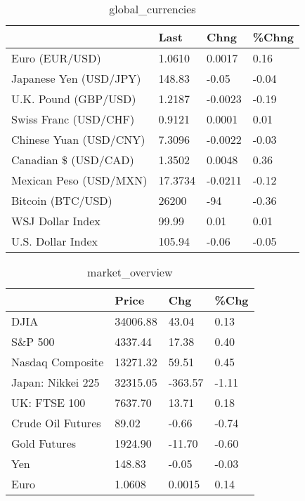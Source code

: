 \documentclass{article}%
\begin{document}
%


\begin{table}[htbp]%
\caption{global\_currencies}%
\centering%
\begin{adjustbox}{width=1\textwidth}%
\begin{tabular}{llll}
\toprule
                       &    Last &    Chng & \%Chng \\
\midrule
        Euro (EUR/USD) &  1.0610 &  0.0017 &  0.16 \\
Japanese Yen (USD/JPY) &  148.83 &   -0.05 & -0.04 \\
  U.K. Pound (GBP/USD) &  1.2187 & -0.0023 & -0.19 \\
 Swiss Franc (USD/CHF) &  0.9121 &  0.0001 &  0.01 \\
Chinese Yuan (USD/CNY) &  7.3096 & -0.0022 & -0.03 \\
  Canadian \$ (USD/CAD) &  1.3502 &  0.0048 &  0.36 \\
Mexican Peso (USD/MXN) & 17.3734 & -0.0211 & -0.12 \\
     Bitcoin (BTC/USD) &   26200 &     -94 & -0.36 \\
      WSJ Dollar Index &   99.99 &    0.01 &  0.01 \\
     U.S. Dollar Index &  105.94 &   -0.06 & -0.05 \\
\bottomrule
\end{tabular}
%
\end{adjustbox}%
\end{table}

%


\begin{table}[htbp]%
\caption{market\_overview}%
\centering%
\begin{adjustbox}{width=1\textwidth}%
\begin{tabular}{llll}
\toprule
                  &    Price &     Chg &  \%Chg \\
\midrule
             DJIA & 34006.88 &   43.04 &  0.13 \\
          S\&P 500 &  4337.44 &   17.38 &  0.40 \\
 Nasdaq Composite & 13271.32 &   59.51 &  0.45 \\
Japan: Nikkei 225 & 32315.05 & -363.57 & -1.11 \\
     UK: FTSE 100 &  7637.70 &   13.71 &  0.18 \\
Crude Oil Futures &    89.02 &   -0.66 & -0.74 \\
     Gold Futures &  1924.90 &  -11.70 & -0.60 \\
              Yen &   148.83 &   -0.05 & -0.03 \\
             Euro &   1.0608 &  0.0015 &  0.14 \\
\bottomrule
\end{tabular}
%
\end{adjustbox}%
\end{table}

%
\end{document}
